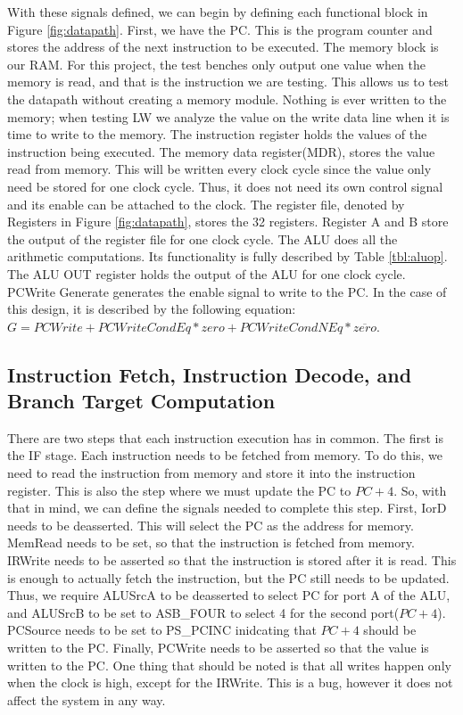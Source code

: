 \documentclass[12pt, a4paper]{article}
\begin{document}
With these signals defined, we can begin by defining each functional block in Figure \ref{fig:datapath}.
First, we have the PC. This is the program counter and stores the address of the next instruction to be
executed. The memory block is our RAM. For this project, the test benches only output one value when the
memory is read, and that is the instruction we are testing. This allows us to test the datapath without
creating a memory module. Nothing is ever written to the memory; when testing LW we analyze the value on
the write data line when it is time to write to the memory. The instruction register holds the values
of the instruction being executed. The memory data register(MDR), stores the value read from memory. This
will be written every clock cycle since the value only need be stored for one clock cycle. Thus, it does
not need its own control signal and its enable can be attached to the clock. The register file, denoted by
Registers in Figure \ref{fig:datapath}, stores the 32 registers. Register A and B store the output of
the register file for one clock cycle. The ALU does all the arithmetic computations. Its functionality
is fully described by Table \ref{tbl:aluop}. The ALU OUT register holds the output of the ALU for one
clock cycle. PCWrite Generate generates the enable signal to write to the PC. In the case of this design,
it is described by the following equation: 
$G = PCWrite + PCWriteCondEq*zero + PCWriteCondNEq*\overline{zero}$.

\subsection{Instruction Fetch, Instruction Decode, and Branch Target Computation}
There are two steps that each instruction execution has in common. The first is the IF stage. Each
instruction needs to be fetched from memory. To do this, we need to read the instruction from memory
and store it into the instruction register. This is also the step where we must update the PC to $PC+4$.
So, with that in mind, we can define the signals needed to complete this step. First, IorD needs to be
deasserted. This will select the PC as the address for memory. MemRead needs to be set, so that the
instruction is fetched from memory. IRWrite needs to be asserted so that the instruction is stored 
after it is read. This is enough to actually fetch the instruction, but the PC still needs to be updated.
Thus, we require ALUSrcA to be deasserted to select PC for port A of the ALU, and ALUSrcB to be set
to ASB\_FOUR to select 4 for the second port($PC+4$). PCSource needs to be set to PS\_PCINC inidcating
that $PC+4$ should be written to the PC. Finally, PCWrite needs to be asserted so that the value is
written to the PC. One thing that should be noted is that all writes happen only when the clock is high,
except for the IRWrite. This is a bug, however it does not affect the system in any way.
\end{document}
